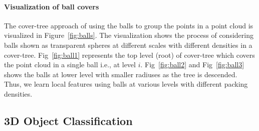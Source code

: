 \documentclass{article}
\begin{document}
\paragraph{Visualization of ball covers}
The cover-tree approach of using the balls to group the points in a point cloud is visualized in Figure~\ref{fig:balls}. The visualization shows the process of considering balls shown as transparent spheres at different scales with different densities in a cover-tree. Fig~\ref{fig:ball1} represents the top level (root) of cover-tree which covers the point cloud in a single ball i.e., at level $i$. Fig~\ref{fig:ball2} and Fig~\ref{fig:ball3} shows the balls at lower level with smaller radiuses as the tree is descended. Thus, we learn local features using balls at various levels with different packing densities.



\subsection{3D Object Classification}
\end{document}
